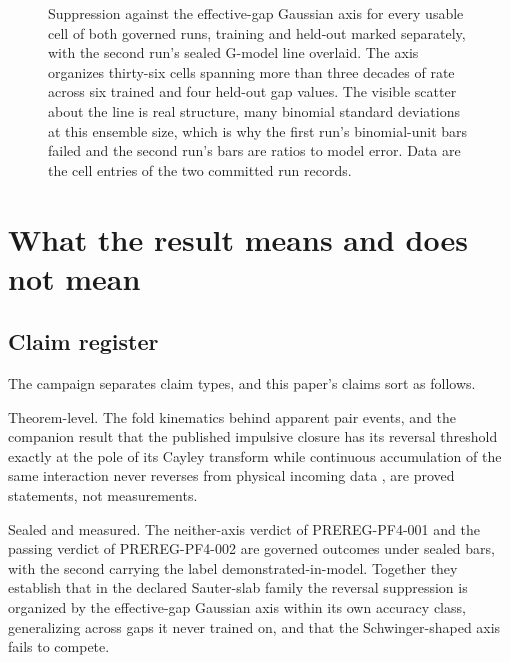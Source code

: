 \documentclass[aps,prd,reprint,nofootinbib,longbibliography]{revtex4-2}
\begin{document}
\begin{figure}[t]
\centering
{}
\caption{Suppression against the effective-gap Gaussian axis for every
usable cell of both governed runs, training and held-out marked
separately, with the second run's sealed G-model line overlaid.  The
axis organizes thirty-six cells spanning more than three decades of
rate across six trained and four held-out gap values.  The visible scatter about
the line is real structure, many binomial standard deviations at this
ensemble size, which is why the first run's binomial-unit bars failed
and the second run's bars are ratios to model error.  Data are the cell
entries of the two committed run records.}
\label{fig:cells}
\end{figure}

\section{What the result means and does not mean}
\label{sec:meaning}

\subsection{Claim register}

The campaign separates claim types, and this paper's claims sort as
follows.

Theorem-level.  The fold kinematics behind apparent pair events, and the
companion result that the published impulsive closure has its reversal
threshold exactly at the pole of its Cayley transform while continuous
accumulation of the same interaction never reverses from physical
incoming data \cite{ZenodoCayley}, are proved statements, not
measurements.

Sealed and measured.  The neither-axis verdict of PREREG-PF4-001 and the
passing verdict of PREREG-PF4-002 are governed outcomes under sealed
bars, with the second carrying the label demonstrated-in-model.  Together
they establish that in the declared Sauter-slab family the reversal
suppression is organized by the effective-gap Gaussian axis within its
own accuracy class, generalizing across gaps it never trained on, and
that the Schwinger-shaped axis fails to compete.
\end{document}
